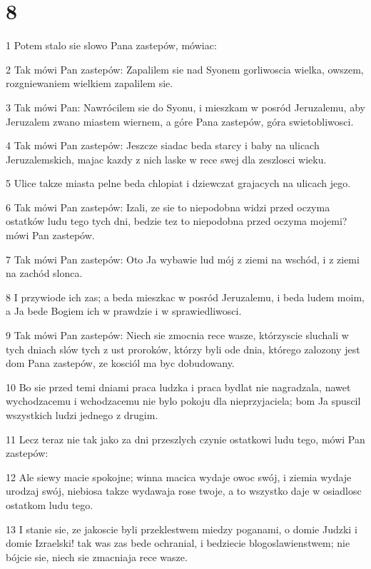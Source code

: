 \chapter{8}

\par 1 Potem stalo sie slowo Pana zastepów, mówiac:
\par 2 Tak mówi Pan zastepów: Zapalilem sie nad Syonem gorliwoscia wielka, owszem, rozgniewaniem wielkiem zapalilem sie.
\par 3 Tak mówi Pan: Nawrócilem sie do Syonu, i mieszkam w posród Jeruzalemu, aby Jeruzalem zwano miastem wiernem, a góre Pana zastepów, góra swietobliwosci.
\par 4 Tak mówi Pan zastepów: Jeszcze siadac beda starcy i baby na ulicach Jeruzalemskich, majac kazdy z nich laske w rece swej dla zeszlosci wieku.
\par 5 Ulice takze miasta pelne beda chlopiat i dziewczat grajacych na ulicach jego.
\par 6 Tak mówi Pan zastepów: Izali, ze sie to niepodobna widzi przed oczyma ostatków ludu tego tych dni, bedzie tez to niepodobna przed oczyma mojemi? mówi Pan zastepów.
\par 7 Tak mówi Pan zastepów: Oto Ja wybawie lud mój z ziemi na wschód, i z ziemi na zachód slonca.
\par 8 I przywiode ich zas; a beda mieszkac w posród Jeruzalemu, i beda ludem moim, a Ja bede Bogiem ich w prawdzie i w sprawiedliwosci.
\par 9 Tak mówi Pan zastepów: Niech sie zmocnia rece wasze, którzyscie sluchali w tych dniach slów tych z ust proroków, którzy byli ode dnia, którego zalozony jest dom Pana zastepów, ze kosciól ma byc dobudowany.
\par 10 Bo sie przed temi dniami praca ludzka i praca bydlat nie nagradzala, nawet wychodzacemu i wchodzacemu nie bylo pokoju dla nieprzyjaciela; bom Ja spuscil wszystkich ludzi jednego z drugim.
\par 11 Lecz teraz nie tak jako za dni przeszlych czynie ostatkowi ludu tego, mówi Pan zastepów:
\par 12 Ale siewy macie spokojne; winna macica wydaje owoc swój, i ziemia wydaje urodzaj swój, niebiosa takze wydawaja rose twoje, a to wszystko daje w osiadlosc ostatkom ludu tego.
\par 13 I stanie sie, ze jakoscie byli przeklestwem miedzy poganami, o domie Judzki i domie Izraelski! tak was zas bede ochranial, i bedziecie blogoslawienstwem; nie bójcie sie, niech sie zmacniaja rece wasze.
